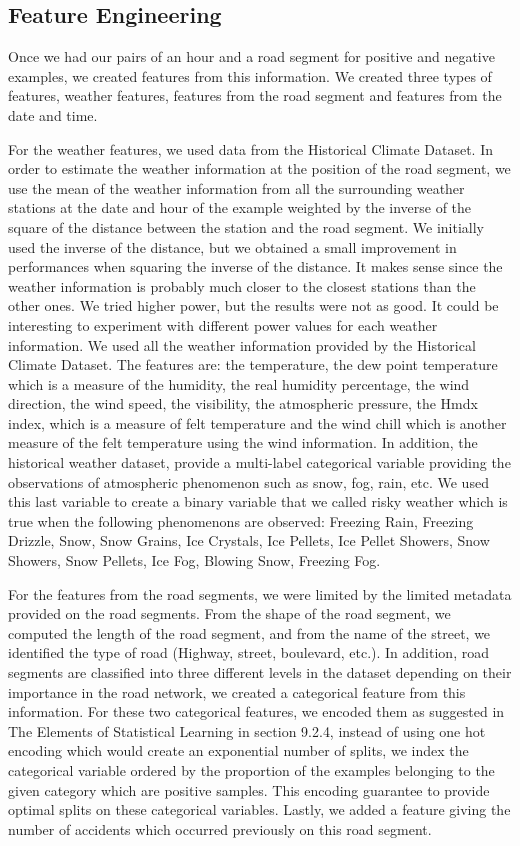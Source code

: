 \documentclass[conference]{IEEEtran}
\begin{document}
\subsection{Feature Engineering}
Once we had our pairs of an hour and a road segment for positive and negative examples, we created features from this information.
We created three types of features, weather features, features from the road segment and features from the date and time.

For the weather features, we used data from the Historical Climate Dataset.
In order to estimate the weather information at the position of the road segment, we use the mean of the weather information from all the surrounding weather stations at the date and hour of the example weighted by the inverse of the square of the distance between the station and the road segment.
We initially used the inverse of the distance, but we obtained a small improvement in performances when squaring the inverse of the distance.
It makes sense since the weather information is probably much closer to the closest stations than the other ones.
We tried higher power, but the results were not as good.
It could be interesting to experiment with different power values for each weather information.
We used all the weather information provided by the Historical Climate Dataset.
The features are: the temperature, the dew point temperature which is a measure of the humidity, the real humidity percentage, the wind direction, the wind speed, the visibility, the atmospheric pressure, the Hmdx index, which is a measure of felt temperature and the wind chill which is another measure of the felt temperature using the wind information.
In addition, the historical weather dataset, provide a multi-label categorical variable providing the observations of atmospheric phenomenon such as snow, fog, rain, etc.
We used this last variable to create a binary variable that we called risky weather which is true when the following phenomenons are observed: Freezing Rain, Freezing Drizzle, Snow, Snow Grains, Ice Crystals, Ice Pellets, Ice Pellet Showers, Snow Showers, Snow Pellets, Ice Fog, Blowing Snow, Freezing Fog.

For the features from the road segments, we were limited by the limited metadata provided on the road segments.
From the shape of the road segment, we computed the length of the road segment, and from the name of the street, we identified the type of road (Highway, street, boulevard, etc.).
In addition, road segments are classified into three different levels in the dataset depending on their importance in the road network, we created a categorical feature from this information.
For these two categorical features, we encoded them as suggested in The Elements of Statistical Learning\cite{elementsofstat} in section 9.2.4, instead of using one hot encoding which would create an exponential number of splits, we index the categorical variable ordered by the proportion of the examples belonging to the given category which are positive samples.
This encoding guarantee to provide optimal splits on these categorical variables.
Lastly, we added a feature giving the number of accidents which occurred previously on this road segment.
\end{document}
